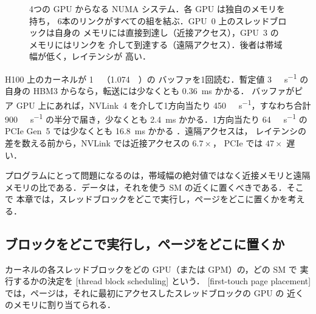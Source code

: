\documentclass[../main.tex]{subfiles}
\begin{document}
\begin{figure}[tb]
  \centering
  
  \caption{4つの GPU からなる NUMA システム．各 GPU は独自のメモリを持ち，
    6本のリンクがすべての組を結ぶ．GPU~0 上のスレッドブロックは自身の
    メモリには直接到達し（近接アクセス），GPU~3 のメモリにはリンクを
    介して到達する（遠隔アクセス）．後者は帯域幅が低く，レイテンシが
    高い．}
  \label{fig:l09-numa}
\end{figure}

\begin{example}[近接と遠隔を数値で]
  \label{ex:l09-near-far}
  H100 上のカーネルが \SI{1}{\gibi\byte}（\SI{1.074}{\giga\byte}）の
  バッファを1回読む．暫定値 \SI{3}{\tera\byte\per\second} の自身の
  HBM3 からなら，転送には少なくとも \SI{0.36}{\milli\second} かかる．
  バッファがピア GPU 上にあれば，NVLink~4 を介して1方向当たり
  \SI{450}{\giga\byte\per\second}，すなわち合計
  \SI{900}{\giga\byte\per\second} の半分で届き，少なくとも
  \SI{2.4}{\milli\second} かかる．1方向当たり
  \SI{64}{\giga\byte\per\second} の PCIe Gen~5 では少なくとも
  \SI{16.8}{\milli\second} かかる \cite{nvidia2022hopper}．遠隔アクセスは，
  レイテンシの差を数える前から，NVLink では近接アクセスの $6.7\times$，
  PCIe では $47\times$ 遅い．
\end{example}

%
プログラムにとって問題になるのは，帯域幅の絶対値ではなく近接メモリと遠隔
メモリの比である．データは，それを使う SM の近くに置くべきである．そこで
本章では，スレッドブロックをどこで実行し，ページをどこに置くかを考える．

\subsection{ブロックをどこで実行し，ページをどこに置くか}

\begin{definition}
  カーネルの各スレッドブロックをどの GPU（または GPM）の，どの SM で
  実行するかの決定を
  [thread block scheduling]
  という．
  [first-touch page placement]
  では，ページは，それに最初にアクセスしたスレッドブロックの GPU の
  近くのメモリに割り当てられる．
\end{definition}
\end{document}
